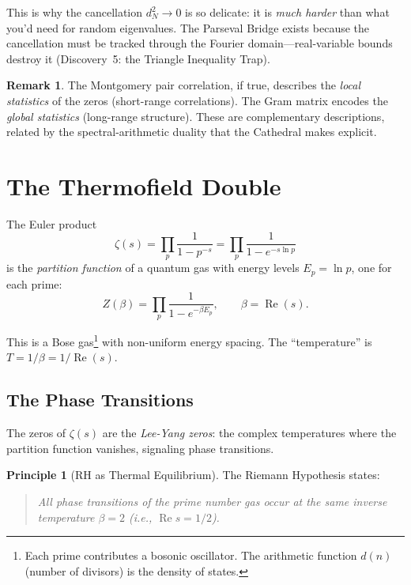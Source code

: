 \documentclass[11pt,a4paper]{article}
\theoremstyle{definition}
\newtheorem{principle}[observation]{Principle}
\newtheorem{remark}[observation]{Remark}
\newcommand{\re}{\operatorname{Re}}
\begin{document}
This is why the cancellation $d_N^2 \to 0$ is so delicate: it is
\emph{much harder} than what you'd need for random eigenvalues.
The Parseval Bridge exists because the cancellation must be tracked
through the Fourier domain---real-variable bounds destroy it
(Discovery~5: the Triangle Inequality Trap).

\begin{remark}
The Montgomery pair correlation, if true, describes the
\emph{local statistics} of the zeros (short-range correlations).
The Gram matrix encodes the \emph{global statistics} (long-range
structure). These are complementary descriptions, related by the
spectral-arithmetic duality that the Cathedral makes explicit.
\end{remark}

\section{The Thermofield Double}
\label{sec:thermofield}

The Euler product
\[
  \zeta(s) = \prod_p \frac{1}{1 - p^{-s}}
  = \prod_p \frac{1}{1 - e^{-s \ln p}}
\]
is the \emph{partition function} of a quantum gas with energy levels
$E_p = \ln p$, one for each prime:
\[
  Z(\beta) = \prod_p \frac{1}{1 - e^{-\beta E_p}}, \qquad
  \beta = \re(s).
\]

This is a Bose gas\footnote{Each prime contributes a bosonic
oscillator. The arithmetic function $d(n)$ (number of divisors)
is the density of states.} with non-uniform energy spacing.
The ``temperature'' is $T = 1/\beta = 1/\re(s)$.

\subsection{The Phase Transitions}

The zeros of $\zeta(s)$ are the \emph{Lee-Yang zeros}: the complex
temperatures where the partition function vanishes, signaling phase
transitions.

\begin{principle}[RH as Thermal Equilibrium]
The Riemann Hypothesis states:
\begin{quote}
\emph{All phase transitions of the prime number gas occur at the
same inverse temperature $\beta = 2$ (i.e., $\re s = 1/2$).}
\end{quote}
\end{principle}
\end{document}
